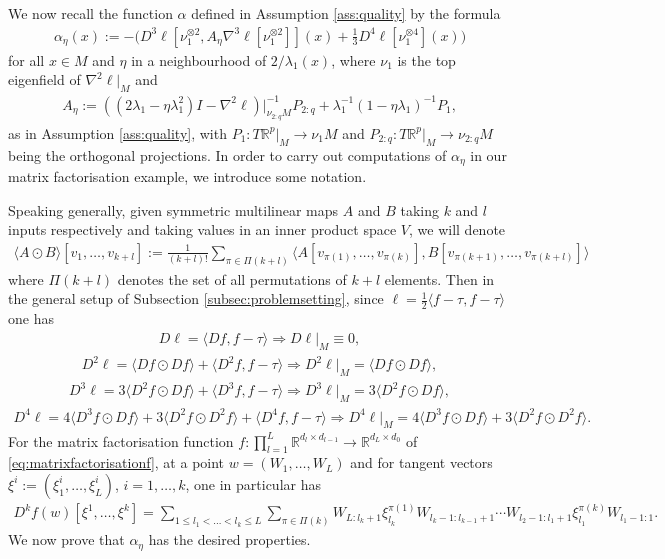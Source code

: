 \documentclass{article}
\newcommand{\RB}{\mathbb{R}}
\theoremstyle{plain}
\theoremstyle{definition}
\theoremstyle{remark}
\begin{document}
We now recall the function $\alpha$ defined in Assumption \ref{ass:quality} by the formula
\begin{align}\label{eq:alpha}
\alpha_{\eta}(x):=-\bigg(D^3\ell[\nu_1^{\otimes 2},A_{\eta}\nabla^3\ell[\nu_1^{\otimes 2}]](x) + \frac{1}{3}D^4\ell[\nu_1^{\otimes 4}](x)\bigg)
\end{align}
for all $x\in M$ and $\eta$ in a neighbourhood of $2/\lambda_1(x)$, where $\nu_1$ is the top eigenfield of $\nabla^2\ell|_M$ and
\begin{align}
    A_{\eta}:=((2\lambda_1-\eta\lambda_1^2)I-\nabla^2\ell)|_{\nu_{2:q}M}^{-1}P_{2:q} + \lambda_1^{-1}(1-\eta\lambda_1)^{-1}P_1,
\end{align}
as in Assumption \ref{ass:quality}, with $P_1:T\RB^p|_M\rightarrow \nu_1M$ and $P_{2:q}:T\RB^p|_M\rightarrow \nu_{2:q}M$ being the orthogonal projections. In order to carry out computations of $\alpha_{\eta}$ in our matrix factorisation example, we introduce some notation.

Speaking generally, given symmetric multilinear maps $A$ and $B$ taking $k$ and $l$ inputs respectively and taking values in an inner product space $V$, we will denote
\begin{align}
\langle A\odot B\rangle[v_1,\dots,v_{k+l}]:=\frac{1}{(k+l)!}\sum_{\pi\in\Pi(k+l)}\langle A[v_{\pi(1)},\dots,v_{\pi(k)}],B[v_{\pi(k+1)},\dots,v_{\pi(k+l)}]\rangle
\end{align}
where $\Pi(k+l)$ denotes the set of all permutations of $k+l$ elements. Then in the general setup of Subsection \ref{subsec:problemsetting}, since $\ell = \frac{1}{2}\langle f-\tau,f-\tau\rangle$ one has
\begin{align}\label{eq:Dell}
    D\ell =\langle Df,f-\tau\rangle\Rightarrow D\ell|_M\equiv 0,
\end{align}
\begin{align}\label{eq:D2ell}
    D^2\ell = \langle Df\odot Df\rangle + \langle D^2f,f-\tau\rangle\Rightarrow D^2\ell|_M = \langle Df\odot Df\rangle,
\end{align}
\begin{align}\label{eq:D3ell}
    D^3\ell = 3\langle D^2f\odot Df\rangle + \langle D^3f,f-\tau\rangle\Rightarrow D^3\ell|_M = 3\langle D^2f\odot Df\rangle,
\end{align}
\begin{align}\label{eq:D4ell}
    D^4\ell = 4\langle D^3f\odot Df\rangle + 3\langle D^2f\odot D^2f\rangle + \langle D^4f,f-\tau\rangle\Rightarrow D^4\ell|_M = 4\langle D^3f\odot Df\rangle + 3\langle D^2f\odot D^2f\rangle.
\end{align}
For the matrix factorisation function $f:\prod_{l=1}^L\RB^{d_l\times d_{l-1}}\rightarrow\RB^{d_L\times d_0}$ of \eqref{eq:matrixfactorisationf}, at a point $w = (W_1,\dots,W_L)$ and for tangent vectors $\xi^i:=(\xi_1^i,\dots,\xi_L^i)$, $i=1,\dots,k$, one in particular has
\begin{align}\label{eq:Dkf}
    D^kf(w)[\xi^1,\dots,\xi^k] = \sum_{1\leq l_1<\dots<l_k\leq L}\sum_{\pi\in\Pi(k)}W_{L:l_k+1}\xi^{\pi(1)}_{l_k}W_{l_k-1:l_{k-1}+1}\cdots W_{l_2-1:l_1+1}\xi^{\pi(k)}_{l_1}W_{l_{1}-1:1}.
\end{align}
We now prove that $\alpha_{\eta}$ has the desired properties.
\end{document}
